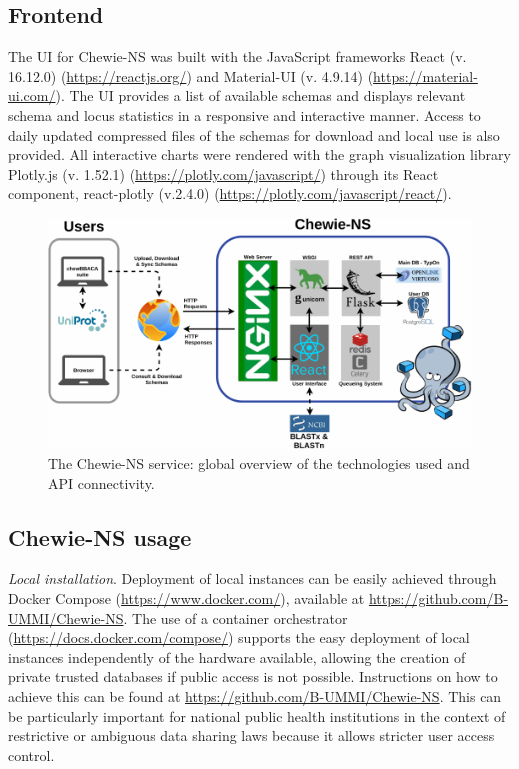 \subsection{Frontend} \label{ssec:ch3_database_creation_frontend}

The \ac{UI} for \ac{Chewie-NS} was built with the JavaScript frameworks React (v. 16.12.0) (\url{https://reactjs.org/}) and Material-UI (v. 4.9.14) (\url{https://material-ui.com/}). The \ac{UI} provides a list of available schemas and displays relevant schema and locus statistics in a responsive and interactive manner. Access to daily updated compressed files of the schemas for download and local use is also provided. All interactive charts were rendered with the graph visualization library Plotly.js (v. 1.52.1) (\url{https://plotly.com/javascript/}) through its React component, react-plotly (v.2.4.0) (\url{https://plotly.com/javascript/react/}).

\newpage
\begin{landscape}
\vspace*{\fill}
\begin{figure}[h!]
    \centering
    \includegraphics[width=20cm]{figures/chapter 3/Figure1.pdf}
    \caption{The Chewie-NS service: global overview of the technologies used and API connectivity.}
    \label{fig:chap3_figure1}
\end{figure}
\vspace*{\fill}
\end{landscape}

\subsection{Chewie-NS usage} \label{ssec:ch3_database_creation_usage}

\textit{Local installation}. Deployment of local instances can be easily achieved through Docker Compose (\url{https://www.docker.com/}), available at \url{https://github.com/B-UMMI/Chewie-NS}. The use of a container orchestrator (\url{https://docs.docker.com/compose/}) supports the easy deployment of local instances independently of the hardware available, allowing the creation of private trusted databases if public access is not possible. Instructions on how to achieve this can be found at \url{https://github.com/B-UMMI/Chewie-NS}. This can be particularly important for national public health institutions in the context of restrictive or ambiguous data sharing laws because it allows stricter user access control.

